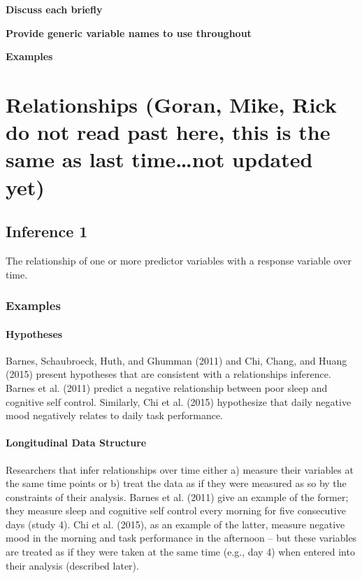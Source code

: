 \documentclass[english,,man]{apa6}
\let\oldparagraph\paragraph
\renewcommand{\paragraph}[1]{\oldparagraph{#1}\mbox{}}
\theoremstyle{definition}
\theoremstyle{definition}
\theoremstyle{definition}
\theoremstyle{remark}
\begin{document}
\textbf{Discuss each briefly}

\textbf{Provide generic variable names to use throughout}

\textbf{Examples}

\hypertarget{relationships-goran-mike-rick-do-not-read-past-here-this-is-the-same-as-last-timenot-updated-yet}{%
\section{Relationships (Goran, Mike, Rick do not read past here, this is
the same as last time\ldots{}not updated
yet)}\label{relationships-goran-mike-rick-do-not-read-past-here-this-is-the-same-as-last-timenot-updated-yet}}

\hypertarget{inference-1}{%
\subsection{Inference 1}\label{inference-1}}

The relationship of one or more predictor variables with a response
variable over time.

\hypertarget{examples}{%
\subsubsection{Examples}\label{examples}}

\hypertarget{hypotheses}{%
\paragraph{Hypotheses}\label{hypotheses}}

Barnes, Schaubroeck, Huth, and Ghumman (2011) and Chi, Chang, and Huang
(2015) present hypotheses that are consistent with a relationships
inference. Barnes et al. (2011) predict a negative relationship between
poor sleep and cognitive self control. Similarly, Chi et al. (2015)
hypothesize that daily negative mood negatively relates to daily task
performance.

\hypertarget{longitudinal-data-structure}{%
\paragraph{Longitudinal Data
Structure}\label{longitudinal-data-structure}}

Researchers that infer relationships over time either a) measure their
variables at the same time points or b) treat the data as if they were
measured as so by the constraints of their analysis. Barnes et al.
(2011) give an example of the former; they measure sleep and cognitive
self control every morning for five consecutive days (study 4). Chi et
al. (2015), as an example of the latter, measure negative mood in the
morning and task performance in the afternoon -- but these variables are
treated as if they were taken at the same time (e.g., day 4) when
entered into their analysis (described later).
\end{document}
